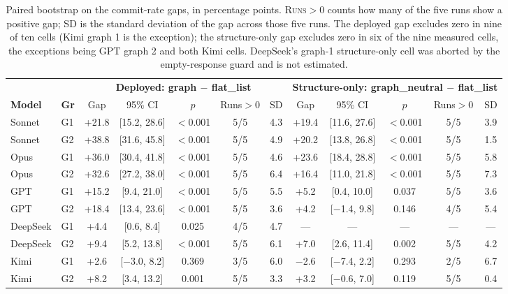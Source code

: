 \documentclass[11pt]{article}
\begin{document}
\begin{table}[t]
\centering
\footnotesize
\setlength{\tabcolsep}{4.5pt}
\begin{tabular}{@{}ll|ccccc|ccccc@{}}
\toprule
& & \multicolumn{5}{c|}{\textbf{Deployed: graph $-$ flat\_list}} & \multicolumn{5}{c}{\textbf{Structure-only: graph\_neutral $-$ flat\_list}} \\
\textbf{Model} & \textbf{Gr} & Gap & 95\% CI & $p$ & Runs$>$0 & SD & Gap & 95\% CI & $p$ & Runs$>$0 & SD \\
\midrule
Sonnet & G1 & +21.8 & [15.2, 28.6] & $<$0.001 & 5/5 & 4.3 & +19.4 & [11.6, 27.6] & $<$0.001 & 5/5 & 3.9 \\
Sonnet & G2 & +38.8 & [31.6, 45.8] & $<$0.001 & 5/5 & 4.9 & +20.2 & [13.8, 26.8] & $<$0.001 & 5/5 & 1.5 \\
Opus & G1 & +36.0 & [30.4, 41.8] & $<$0.001 & 5/5 & 4.6 & +23.6 & [18.4, 28.8] & $<$0.001 & 5/5 & 5.8 \\
Opus & G2 & +32.6 & [27.2, 38.0] & $<$0.001 & 5/5 & 6.4 & +16.4 & [11.0, 21.8] & $<$0.001 & 5/5 & 7.3 \\
GPT & G1 & +15.2 & [9.4, 21.0] & $<$0.001 & 5/5 & 5.5 & +5.2 & [0.4, 10.0] & 0.037 & 5/5 & 3.6 \\
GPT & G2 & +18.4 & [13.4, 23.6] & $<$0.001 & 5/5 & 3.6 & +4.2 & [$-$1.4, 9.8] & 0.146 & 4/5 & 5.4 \\
DeepSeek & G1 & +4.4 & [0.6, 8.4] & 0.025 & 4/5 & 4.7 & --- & --- & --- & --- & --- \\
DeepSeek & G2 & +9.4 & [5.2, 13.8] & $<$0.001 & 5/5 & 6.1 & +7.0 & [2.6, 11.4] & 0.002 & 5/5 & 4.2 \\
Kimi & G1 & +2.6 & [$-$3.0, 8.2] & 0.369 & 3/5 & 6.0 & $-$2.6 & [$-$7.4, 2.2] & 0.293 & 2/5 & 6.7 \\
Kimi & G2 & +8.2 & [3.4, 13.2] & 0.001 & 5/5 & 3.3 & +3.2 & [$-$0.6, 7.0] & 0.119 & 5/5 & 0.4 \\
\bottomrule
\end{tabular}
\caption{Paired bootstrap on the commit-rate gaps, in percentage points.
\textsc{Runs}$>$0 counts how many of the five runs show a positive gap; SD is
the standard deviation of the gap across those five runs. The deployed gap
excludes zero in nine of ten cells (Kimi graph 1 is the exception); the
structure-only gap excludes zero in six of the nine measured cells, the
exceptions being GPT graph 2 and both Kimi cells. DeepSeek's graph-1
structure-only cell was aborted by the empty-response guard and is not
estimated.}
\label{tab:ci}
\end{table}
\end{document}
